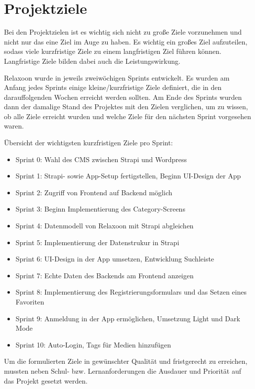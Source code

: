 \section{Projektziele}


Bei den Projektzielen ist es wichtig sich nicht zu große Ziele vorzunehmen und nicht nur das eine Ziel im Auge zu haben.
Es wichtig ein großes Ziel aufzuteilen, sodass viele kurzfristige Ziele zu einem langfristigen Ziel führen können.
Langfristige Ziele bilden dabei auch die Leistungswirkung. 

Relaxoon wurde in jeweils zweiwöchigen Sprints entwickelt. Es wurden am Anfang jedes Sprints einige 
kleine/kurzfristige Ziele definiert, die in den darauffolgenden Wochen erreicht werden sollten. Am Ende des 
Sprints wurden dann der damalige Stand des Projektes mit den Zielen verglichen, um zu wissen, ob alle Ziele 
erreicht wurden und welche Ziele für den nächsten Sprint vorgesehen waren.

Übersicht der wichtigsten kurzfristigen Ziele pro Sprint:
\begin{itemize}
      \item Sprint 0: Wahl des CMS zwischen Strapi und Wordpress
      \item Sprint 1: Strapi- sowie App-Setup fertigstellen, Beginn UI-Design der App
      \item Sprint 2: Zugriff von Frontend auf Backend möglich
      \item Sprint 3: Beginn Implementierung des Category-Screens
      \item Sprint 4: Datenmodell von Relaxoon mit Strapi abgleichen
      \item Sprint 5: Implementierung der Datenstrukur in Strapi
      \item Sprint 6: UI-Design in der App umsetzen, Entwicklung Suchleiste
      \item Sprint 7: Echte Daten des Backends am Frontend anzeigen
      \item Sprint 8: Implementierung des Registrierungsformulars und das Setzen eines Favoriten 
      \item Sprint 9: Anmeldung in der App ermöglichen, Umsetzung Light und Dark Mode
      \item Sprint 10: Auto-Login, Tags für Medien hinzufügen
\end{itemize}




Um die formulierten Ziele in gewünschter Qualität und fristgerecht zu erreichen, mussten
neben Schul- bzw. Lernanforderungen die Ausdauer und Priorität auf das Projekt
gesetzt werden.
